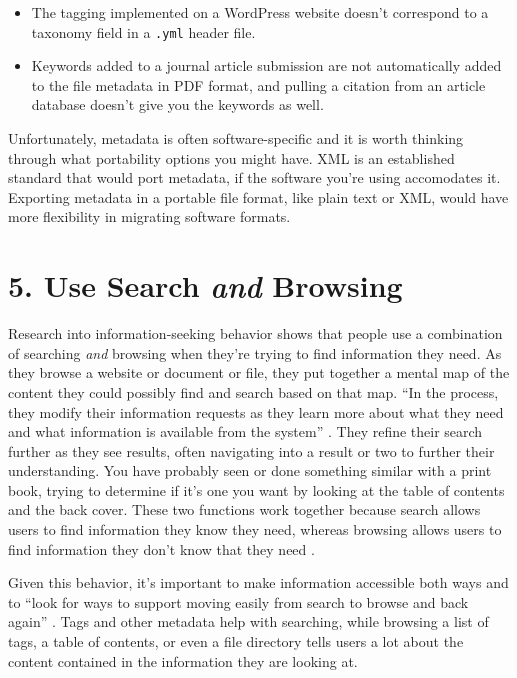 \documentclass[10pt,letterpaper]{article}
\newcommand{\rulemajor}[1]{\section*{#1}}
\begin{document}
\begin{itemize}

\item
  The tagging implemented on a WordPress website doesn't correspond to a
  taxonomy field in a \texttt{.yml} header file.

\item
  Keywords added to a journal article submission are not automatically added to
  the file metadata in PDF format, and pulling a citation from an article
  database doesn't give you the keywords as well.

\end{itemize}

Unfortunately, metadata is often software-specific and it is worth thinking
through what portability options you might have.  XML is an established standard
that would port metadata, if the software you're using accomodates it. Exporting
metadata in a portable file format, like plain text or XML, would have more
flexibility in migrating software formats.

\rulemajor{5. Use Search \emph{and} Browsing}

Research into information-seeking behavior shows that people use a combination
of searching \emph{and} browsing when they're trying to find information they
need. As they browse a website or document or file, they put together a mental
map of the content they could possibly find and search based on that map. ``In
the process, they modify their information requests as they learn more about
what they need and what information is available from the system''
\cite{Rosenfeld2015}. They refine their search further as they see results,
often navigating into a result or two to further their understanding. You have
probably seen or done something similar with a print book, trying to determine
if it's one you want by looking at the table of contents and the back
cover. These two functions work together because search allows users to find
information they know they need, whereas browsing allows users to find
information they don't know that they need \cite{Bates2002}.

Given this behavior, it's important to make information accessible both ways and
to ``look for ways to support moving easily from search to browse and back
again'' \cite{Rosenfeld2015}. Tags and other metadata help with searching, while
browsing a list of tags, a table of contents, or even a file directory tells
users a lot about the content contained in the information they are looking at.
\end{document}
